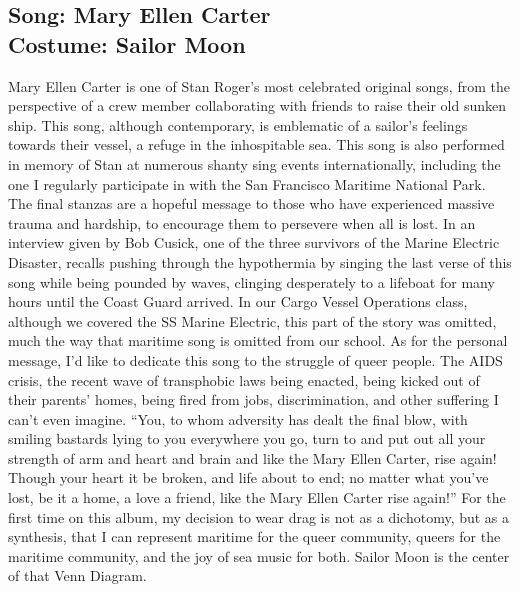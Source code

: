 \documentclass{article}[12pt,letterpaper]
\begin{document}
\subsection{Song: Mary Ellen Carter\\
Costume: Sailor Moon}
Mary Ellen Carter is one of Stan Roger’s most celebrated original songs, from the perspective of a crew member collaborating with friends to raise their old sunken ship. This song, although contemporary, is emblematic of a sailor’s feelings towards their vessel, a refuge in the inhospitable sea.  This song is also performed in memory of Stan at numerous shanty sing events internationally, including the one I regularly participate in with the San Francisco Maritime National Park.
The final stanzas are a hopeful message to those who have experienced massive trauma and hardship, to encourage them to persevere when all is lost. In an interview given by Bob Cusick, one of the three survivors of the Marine Electric Disaster, recalls pushing through the hypothermia by singing the last verse of this song while being pounded by waves, clinging desperately to a lifeboat for many hours until the Coast Guard arrived. In our Cargo Vessel Operations class, although we covered the SS Marine Electric, this part of the story was omitted, much the way that maritime song is omitted from our school.
As for the personal message, I’d like to dedicate this song to the struggle of queer people. The AIDS crisis, the recent wave of transphobic laws being enacted, being kicked out of their parents’ homes, being fired from jobs, discrimination, and other suffering I can’t even imagine. “You, to whom adversity has dealt the final blow, with smiling bastards lying to you everywhere you go, turn to and put out all your strength of arm and heart and brain and like the Mary Ellen Carter, rise again! Though your heart it be broken, and life about to end; no matter what you’ve lost, be it a home, a love a friend, like the Mary Ellen Carter rise again!” For the first time on this album, my decision to wear drag is not as a dichotomy, but as a synthesis, that I can represent maritime for the queer community, queers for the maritime community, and the joy of sea music for both. Sailor Moon is the center of that Venn Diagram.
\end{document}
